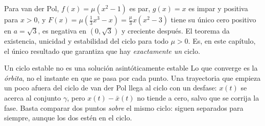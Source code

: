 Para van der Pol, $f(x)=\mu(x^2-1)$ es par, $g(x)=x$ es impar y positiva para $x>0$, y $F(x)=\mu(\tfrac13x^3-x)=\tfrac\mu3x(x^2-3)$ tiene su único cero positivo en $a=\sqrt3$, es negativa en $(0,\sqrt3)$ y creciente después. El teorema da existencia, unicidad y estabilidad del ciclo para todo $\mu>0$. Es, en este capítulo, el único resultado que garantiza que hay \emph{exactamente un} ciclo.


\begin{trampa}[label=tr:oc-orbital]{Un ciclo estable no es una solución asintóticamente estable}
Lo que converge es la \emph{órbita}, no el instante en que se pasa por cada punto. Una trayectoria que empieza un poco afuera del ciclo de van der Pol llega al ciclo con un desfase: $x(t)$ se acerca al conjunto $\gamma$, pero $x(t)-\bar x(t)$ no tiende a cero, salvo que se corrija la fase. Basta comparar dos puntos \emph{sobre} el mismo ciclo: siguen separados para siempre, aunque los dos estén en el ciclo.
\end{trampa}
